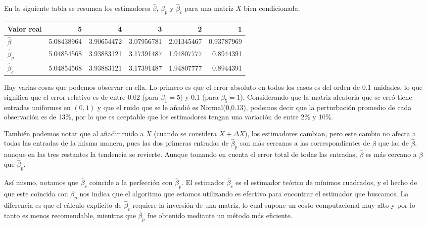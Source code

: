 \documentclass{article}
\begin{document}
\begin{enumerate}
\begin{enumerate}
        En la siguiente tabla se resumen los estimadores $\hat\beta$, $\hat\beta_p$ y $\hat\beta_c$
        para una matriz $X$ bien condicionada. 
        \begin{center}
            \begin{tabular}{@{}lrrrrr@{}}
                \toprule
                Valor real & 5 & 4 & 3 & 2 & 1 \\ \midrule
                $\hat\beta$ & 5.08438964 & 3.90654472 & 3.07956781 & 2.01345467 & 0.93787969 \\
                $\hat\beta_p$ & 5.04854568 & 3.93883121 & 3.17391487 & 1.94807777 & 0.8944391 \\
                $\hat\beta_c$ & 5.04854568 & 3.93883121 & 3.17391487 & 1.94807777 & 0.8944391 \\ \bottomrule
                \end{tabular}
        \end{center}

        Hay varias cosas que podemos observar en ella. Lo primero es que el error absoluto en todos los casos
        es del orden de 0.1 unidades, lo que significa que el error relativo es de entre 0.02 (para $\beta_1 = 5$)
        y 0.1 (para $\beta_5 = 1$). Considerando que la matriz aleatoria que se creó tiene entradas uniformes en $(0,1)$
        y que el ruido que se le añadió es Normal(0,0.13), podemos decir que la perturbación promedio de cada observación
        es de 13\%, por lo que es aceptable que los estimadores tengan una variación de entre 2\% y 10\%.

        También podemos notar que al añadir ruido a $X$ (cuando se considera $X + \Delta X$), los estimadores cambian, 
        pero este cambio no afecta a todas las entradas de la misma manera, pues las dos primeras entradas de 
        $\hat\beta_p$ son más cercanas a las correspondientes de $\beta$ que las de $\hat\beta$, aunque en las tres restantes
        la tendencia se revierte. Aunque tomando en cuenta el error total de todas las entradas, $\hat\beta$ es más
        cercano a $\beta$ que $\hat\beta_p$.

        Así mismo, notamos que $\hat\beta_c$ coincide a la perfección con $\hat\beta_p$. El estimador $\hat\beta_c$
        es el estimador teórico de mínimos cuadrados, y el hecho de que este coincida con $\beta_p$ nos indica
        que el algoritmo que estamos utilizando es efectivo para encontrar el estimador que buscamos. La
        diferencia es que el cálculo explícito de $\hat\beta_c$ requiere la inversión de una matriz, lo cual
        supone un costo computacional muy alto y por lo tanto es menos recomendable, mientras que $\hat\beta_p$ fue
        obtenido mediante un método más eficiente.


\end{enumerate}
\end{enumerate}
\end{document}
